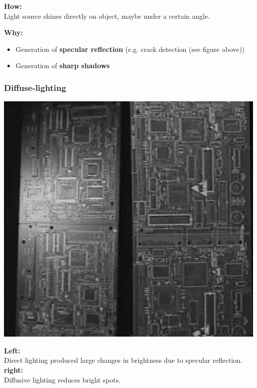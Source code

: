\documentclass[a4paper, fontsize=8pt, landscape, DIV=1]{scrartcl}
\begin{document}
\begin{multicols*}{4}
		\textbf{How:}\\
		Light source shines directly on object, maybe under a certain angle.
		\par 
		\textbf{Why:}\\
		\vspace{-0.5cm}
		\begin{itemize}[noitemsep]
			\item Generation of \textbf{specular reflection} (e.g. crack detection (see figure above))
			\item Generation of \textbf{sharp shadows}
		\end{itemize}
		\vfill\null
		\columnbreak
		
		\subsubsection{Diffuse-lighting}
		\begin{minipage}[t]{0.49\columnwidth}
			\begin{flushleft}
				\includegraphics[width=\columnwidth]{images//ImageAcq/diffusive_lighting.png}\\
			\end{flushleft}
		\end{minipage}
		\begin{minipage}[b]{0.49\columnwidth}
			\begin{flushleft}
				\textbf{Left:}\\
				Direct lighting produced large changes in brightness due to specular reflection.\\
				\vspace{0.2cm}
				\textbf{right:}\\
				Diffusive lighting reduces bright spots. 
				\vspace{0.2cm}
			\end{flushleft}
		\end{minipage}
	

\end{multicols*}
\end{document}
